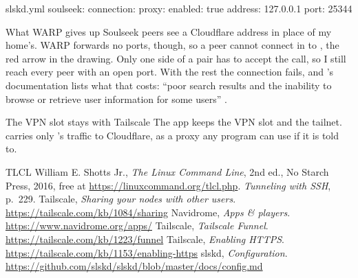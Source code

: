 \documentclass[11pt,a4paper]{article}
\begin{document}
\begin{config}{slskd.yml}
soulseek:
  connection:
    proxy:
      enabled: true
      address: 127.0.0.1
      port: 25344
\end{config}

\begin{insight}{What WARP gives up}
Soulseek peers see a Cloudflare address in place of my home's. WARP forwards no ports, though, so a peer cannot connect in to , the red arrow in the drawing. Only one side of a pair has to accept the call, so I still reach every peer with an open port. With the rest the connection fails, and 's documentation lists what that costs: “poor search results and the inability to browse or retrieve user information for some users” \cite{slskdconf}.
\end{insight}

\begin{result}{The VPN slot stays with Tailscale}
The  app keeps the VPN slot and the tailnet.  carries only 's traffic to Cloudflare, as a proxy any  program can use if it is told to.
\end{result}

\begin{thebibliography}{TLCL}
   William E. Shotts Jr., \textit{The Linux Command Line}, 2nd ed., No Starch Press, 2016, free at \url{https://linuxcommand.org/tlcl.php}. \textit{Tunneling with SSH}, p.~229.
   Tailscale, \textit{Sharing your nodes with other users}. \url{https://tailscale.com/kb/1084/sharing}
   Navidrome, \textit{Apps \& players}. \url{https://www.navidrome.org/apps/}
   Tailscale, \textit{Tailscale Funnel}. \url{https://tailscale.com/kb/1223/funnel}
   Tailscale, \textit{Enabling HTTPS}. \url{https://tailscale.com/kb/1153/enabling-https}
   slskd, \textit{Configuration}. \url{https://github.com/slskd/slskd/blob/master/docs/config.md}
\end{thebibliography}

\revisiontable
\end{document}
